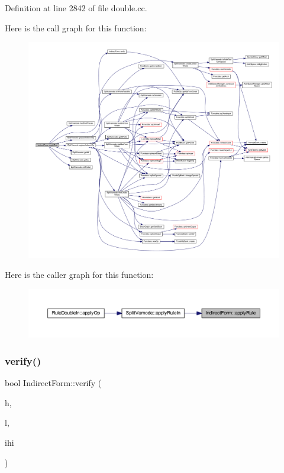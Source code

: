 Definition at line 2842 of file double.\+cc.

Here is the call graph for this function\+:
\nopagebreak
\begin{figure}[H]
\begin{center}
\leavevmode
\includegraphics[width=350pt]{class_indirect_form_ae3b52756c12fe52a8276bd93019da17a_cgraph}
\end{center}
\end{figure}
Here is the caller graph for this function\+:
\nopagebreak
\begin{figure}[H]
\begin{center}
\leavevmode
\includegraphics[width=350pt]{class_indirect_form_ae3b52756c12fe52a8276bd93019da17a_icgraph}
\end{center}
\end{figure}
\mbox{\label{class_indirect_form_a4a8c810890cca97f193fc9a3a720f0fc}} 
\subsubsection{\texorpdfstring{verify()}{verify()}}
{\footnotesize\ttfamily bool Indirect\+Form\+::verify (\begin{DoxyParamCaption}\item[{\mbox{\hyperlink{class_varnode}{Varnode}} $\ast$}]{h,  }\item[{\mbox{\hyperlink{class_varnode}{Varnode}} $\ast$}]{l,  }\item[{\mbox{\hyperlink{class_pcode_op}{Pcode\+Op}} $\ast$}]{ihi }\end{DoxyParamCaption})}



